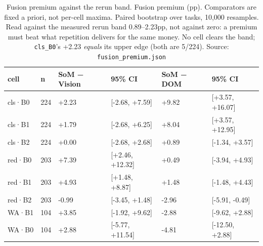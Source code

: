 \begin{table}[tp]
\centering
\caption{Fusion premium against the rerun band. Fusion premium (pp). Comparators are fixed a priori, not per-cell maxima. Paired bootstrap over tasks, 10,000 resamples. Read against the measured rerun band 0.89--2.23pp, not against zero: a premium must beat what repetition delivers for the same money. No cell clears the band; \texttt{cls\_B0}'s +2.23 \emph{equals} its upper edge (both are 5/224). Source: \texttt{fusion\_premium.json}}
\label{tab:t16}
\footnotesize
\setlength{\tabcolsep}{3pt}
\begin{tabular}{@{}llllll@{}}
\toprule
cell & n & SoM − Vision & 95\% CI & SoM − DOM & 95\% CI \\
\midrule
cls·B0 & 224 & +2.23 & {[}-2.68, +7.59{]} & +9.82 & {[}+3.57, +16.07{]} \\
cls·B1 & 224 & +1.79 & {[}-2.68, +6.25{]} & +8.04 & {[}+3.57, +12.95{]} \\
cls·B2 & 224 & +0.00 & {[}-2.68, +2.68{]} & +0.89 & {[}-1.34, +3.57{]} \\
red·B0 & 203 & +7.39 & {[}+2.46, +12.32{]} & +0.49 & {[}-3.94, +4.93{]} \\
red·B1 & 203 & +4.93 & {[}+1.48, +8.87{]} & +1.48 & {[}-1.48, +4.43{]} \\
red·B2 & 203 & -0.99 & {[}-3.45, +1.48{]} & -2.96 & {[}-5.91, -0.49{]} \\
WA·B1 & 104 & +3.85 & {[}-1.92, +9.62{]} & -2.88 & {[}-9.62, +2.88{]} \\
WA·B0 & 104 & +2.88 & {[}-5.77, +11.54{]} & -4.81 & {[}-12.50, +2.88{]} \\
\bottomrule
\end{tabular}
\end{table}
